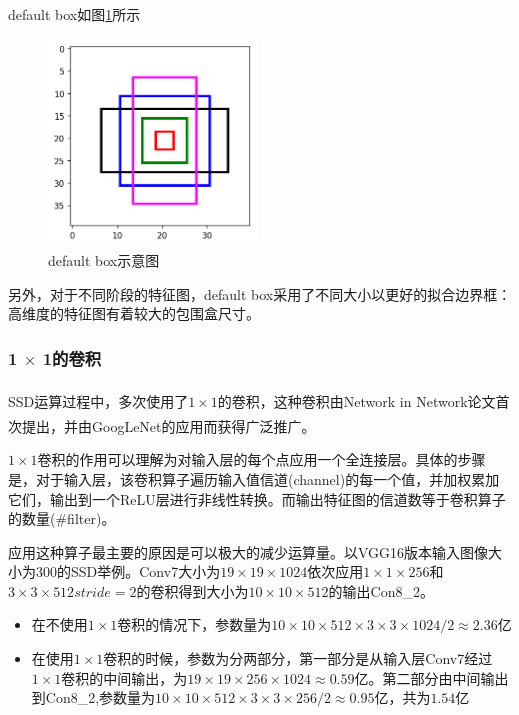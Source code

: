 \documentclass[12pt,a4paper,titlepage]{article}
\newcommand{\upcite}[1]{\textsuperscript{\textsuperscript{\cite{#1}}}}  %
\begin{document}
default box如图\ref{fig:defaultBox}所示

\begin{figure}[h]
\centering
\includegraphics[height=5.5cm]{img/defaultBox.png}
\caption{default box示意图}
\label{fig:defaultBox}
\end{figure}

另外，对于不同阶段的特征图，default box采用了不同大小以更好的拟合边界框：高维度的特征图有着较大的包围盒尺寸。

\subsubsection{1 $\times$ 1的卷积}
SSD运算过程中，多次使用了$1 \times 1$的卷积，这种卷积由Network in Network\upcite{lin2013network}论文首次提出，并由GoogLeNet\upcite{szegedy2015going}的应用而获得广泛推广。

$1\times 1$卷积的作用可以理解为对输入层的每个点应用一个全连接层。具体的步骤是，对于输入层，该卷积算子遍历输入值信道(channel)的每一个值，并加权累加它们，输出到一个ReLU层进行非线性转换。而输出特征图的信道数等于卷积算子的数量(\#filter)。\par

应用这种算子最主要的原因是可以极大的减少运算量。以VGG16版本输入图像大小为300的SSD举例。Conv7大小为$19 \times 19 \times 1024$依次应用$1 \times 1 \times 256$和$3 \times 3 \times 512 stride = 2$的卷积得到大小为$10 \times 10 \times 512$的输出Con8\_2。
\begin{itemize}
\item 在不使用$1 \times 1$卷积的情况下，参数量为$10 \times 10\times 512\times 3 \times 3 \times 1024 /2 \approx2.36$亿
\item 在使用$1 \times 1$卷积的时候，参数为分两部分，第一部分是从输入层Conv7经过$1\times 1$卷积的中间输出，为$19\times 19\times 256\times 1024\approx 0.59$亿。第二部分由中间输出到Con8\_2,参数量为$10\times 10\times 512\times 3\times 3\times 256/2 \approx0.95$亿，共为$1.54$亿
\end{itemize}
\end{document}
